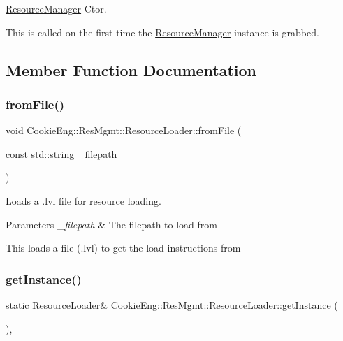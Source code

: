 \hyperlink{class_cookie_eng_1_1_res_mgmt_1_1_resource_manager}{Resource\+Manager} Ctor. 

This is called on the first time the \hyperlink{class_cookie_eng_1_1_res_mgmt_1_1_resource_manager}{Resource\+Manager} instance is grabbed. 

\subsection{Member Function Documentation}
\mbox{\label{class_cookie_eng_1_1_res_mgmt_1_1_resource_loader_a4af1c2439646b511c41a8154282dff49}} 
\subsubsection{\texorpdfstring{from\+File()}{fromFile()}}
{\footnotesize\ttfamily void Cookie\+Eng\+::\+Res\+Mgmt\+::\+Resource\+Loader\+::from\+File (\begin{DoxyParamCaption}\item[{const std\+::string}]{\+\_\+filepath }\end{DoxyParamCaption})}



Loads a .lvl file for resource loading. 


\begin{DoxyParams}{Parameters}
{\em \+\_\+filepath} & The filepath to load from\\
\hline
\end{DoxyParams}
This loads a file (.lvl) to get the load instructions from \mbox{\label{class_cookie_eng_1_1_res_mgmt_1_1_resource_loader_afe0c778fea3c973b5c266a2c74a891ca}} 
\subsubsection{\texorpdfstring{get\+Instance()}{getInstance()}}
{\footnotesize\ttfamily static \hyperlink{class_cookie_eng_1_1_res_mgmt_1_1_resource_loader}{Resource\+Loader}\& Cookie\+Eng\+::\+Res\+Mgmt\+::\+Resource\+Loader\+::get\+Instance (\begin{DoxyParamCaption}{ }\end{DoxyParamCaption})\hspace{0.3cm}{\ttfamily [inline]}, {\ttfamily [static]}}



